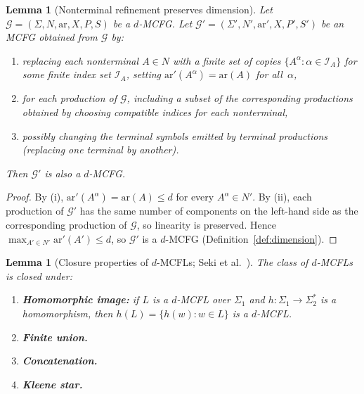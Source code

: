 \documentclass[11pt,a4paper]{article}
\theoremstyle{plain}
\newtheorem{lemma}[theorem]{Lemma}
\theoremstyle{definition}
\theoremstyle{remark}
\begin{document}
\begin{lemma}[Nonterminal refinement preserves dimension]\label{lem:refinement}
Let $\mathcal{G} = (\Sigma, N, \mathrm{ar}, X, P, S)$ be a $d$-MCFG.
Let $\mathcal{G}' = (\Sigma', N', \mathrm{ar}', X, P', S')$ be an MCFG obtained from $\mathcal{G}$ by:
\begin{enumerate}[nosep,label=(\roman*)]
  \item replacing each nonterminal $A \in N$ with a finite set of \emph{copies} $\{A^\alpha : \alpha \in \mathcal{I}_A\}$ for some finite index set $\mathcal{I}_A$, setting $\mathrm{ar}'(A^\alpha) = \mathrm{ar}(A)$ for all~$\alpha$,
  \item for each production of $\mathcal{G}$, including a subset of the corresponding productions obtained by choosing compatible indices for each nonterminal,
  \item possibly changing the terminal symbols emitted by terminal productions (replacing one terminal by another).
\end{enumerate}
Then $\mathcal{G}'$ is also a $d$-MCFG.
\end{lemma}

\begin{proof}
By (i), $\mathrm{ar}'(A^\alpha) = \mathrm{ar}(A) \leq d$ for every $A^\alpha \in N'$.
By (ii), each production of $\mathcal{G}'$ has the same number of components on the left-hand side as the corresponding production of $\mathcal{G}$, so linearity is preserved.
Hence $\max_{A' \in N'} \mathrm{ar}'(A') \leq d$, so $\mathcal{G}'$ is a $d$-MCFG (Definition~\ref{def:dimension}).
\end{proof}

\begin{lemma}[Closure properties of $d$-MCFLs; Seki et al.~\cite{Seki91}]\label{lem:mcfl-closure}
The class of $d$-MCFLs is closed under:
\begin{enumerate}[nosep,label=(\alph*)]
  \item\label{closure:hom} \textbf{Homomorphic image:} if $L$ is a $d$-MCFL over $\Sigma_1$ and $h\colon \Sigma_1 \to \Sigma_2^*$ is a homomorphism, then $h(L) = \{h(w) : w \in L\}$ is a $d$-MCFL.
  \item\label{closure:union} \textbf{Finite union.}
  \item\label{closure:concat} \textbf{Concatenation.}
  \item\label{closure:star} \textbf{Kleene star.}
\end{enumerate}
\end{lemma}
\end{document}

